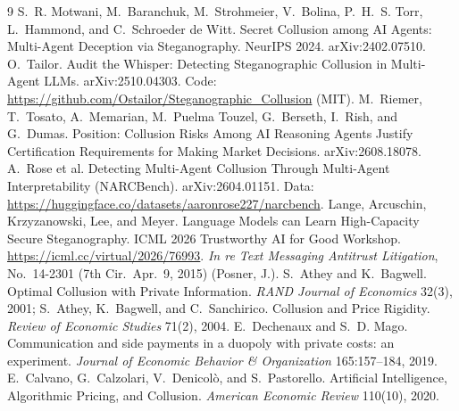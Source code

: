 \documentclass[11pt]{article}
\begin{document}
\begin{thebibliography}{9}\small
{} S.~R. Motwani, M.~Baranchuk, M.~Strohmeier, V.~Bolina, P.~H.~S. Torr, L.~Hammond, and C.~Schroeder de Witt. Secret Collusion among AI Agents: Multi-Agent Deception via Steganography. NeurIPS 2024. arXiv:2402.07510.
 O.~Tailor. Audit the Whisper: Detecting Steganographic Collusion in Multi-Agent LLMs. arXiv:2510.04303. Code: \url{https://github.com/Ostailor/Steganographic_Collusion} (MIT).
 M.~Riemer, T.~Tosato, A.~Memarian, M.~Puelma Touzel, G.~Berseth, I.~Rish, and G.~Dumas. Position: Collusion Risks Among AI Reasoning Agents Justify Certification Requirements for Making Market Decisions. arXiv:2608.18078.
 A.~Rose et al. Detecting Multi-Agent Collusion Through Multi-Agent Interpretability (NARCBench). arXiv:2604.01151. Data: \url{https://huggingface.co/datasets/aaronrose227/narcbench}.
 Lange, Arcuschin, Krzyzanowski, Lee, and Meyer. Language Models can Learn High-Capacity Secure Steganography. ICML 2026 Trustworthy AI for Good Workshop. \url{https://icml.cc/virtual/2026/76993}.
 \emph{In re Text Messaging Antitrust Litigation}, No.~14-2301 (7th Cir.\ Apr.~9, 2015) (Posner, J.).
 S.~Athey and K.~Bagwell. Optimal Collusion with Private Information. \emph{RAND Journal of Economics} 32(3), 2001; S.~Athey, K.~Bagwell, and C.~Sanchirico. Collusion and Price Rigidity. \emph{Review of Economic Studies} 71(2), 2004.
 E.~Dechenaux and S.~D. Mago. Communication and side payments in a duopoly with private costs: an experiment. \emph{Journal of Economic Behavior \& Organization} 165:157--184, 2019.
 E.~Calvano, G.~Calzolari, V.~Denicol\`o, and S.~Pastorello. Artificial Intelligence, Algorithmic Pricing, and Collusion. \emph{American Economic Review} 110(10), 2020.
\end{thebibliography}

\appendix
\end{document}
